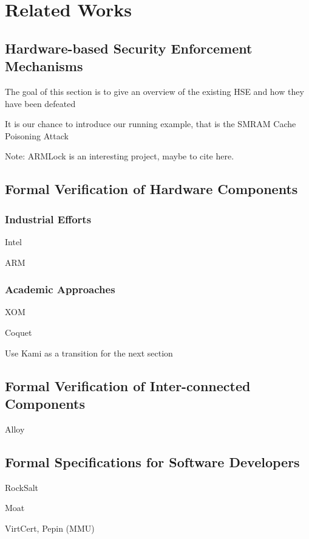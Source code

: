 \chapter{Related Works}
\label{chapter:relatedwork}

\section{Hardware-based Security Enforcement Mechanisms}

\begin{compactitem}
  \item The goal of this section is to give an overview of the existing HSE and how
    they have been defeated
  \item It is our chance to introduce our running example,
    that is the SMRAM Cache Poisoning Attack
\end{compactitem}

Note: ARMLock is an interesting project, maybe to cite here.

\section{Formal Verification of Hardware Components}

\subsection{Industrial Efforts}

\begin{compactitem}
\item Intel
\item ARM
\end{compactitem}

\subsection{Academic Approaches}

\begin{compactitem}
\item XOM
\item Coquet
\item Use Kami as a transition for the next section
\end{compactitem}

\section{Formal Verification of Inter-connected Components}

\begin{compactitem}
\item Alloy
\end{compactitem}

\section{Formal Specifications for Software Developers}

\begin{compactitem}
\item RockSalt
\item Moat
\item VirtCert, Pepin (MMU)
\end{compactitem}